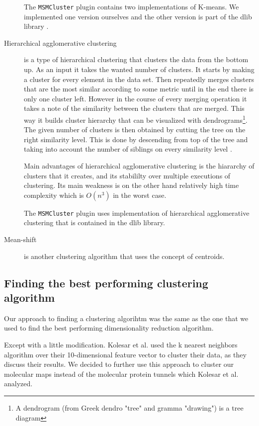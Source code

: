 \documentclass[journal]{vgtc}       %
\begin{document}
\begin{description}
The \verb|MSMCluster| plugin contains two implementations of K-means. We implemented one version ourselves and the other version is part of the dlib library \cite{dlib09}.
\item [Hierarchical agglomerative clustering] is a type of hierarchical clustering that clusters the data from the bottom up. As an input it takes the wanted number of clusters. It starts by making a cluster for every element in the data set. Then repeatedly merges clusters that are the most similar according to some metric until in the end there is only one cluster left. However in the course of every merging operation it takes a note of the similarity between the clusters that are merged. This way it builds cluster hierarchy that can be visualized with dendrograms\footnote{A dendrogram (from Greek dendro "tree" and gramma "drawing") is a tree diagram}. The given number of clusters is then obtained by cutting the tree on the right similarity level. This is done by descending from top of the tree and taking into account the number of siblings on every similarity level \cite{iir}.

Main advantages of hierarchical agglomerative clustering is the hiararchy of clusters that it creates, and its stabililty over multiple executions of clustering. Its main weakness is on the other hand relatively high time complexity which is $O(n^3)$ in the worst case.

The \verb|MSMCluster| plugin uses implementation of hierarchical agglomerative clustering that is contained in the dlib library. 
\item [Mean-shift] is another clustering algorithm that uses the concept of centroids. %
\end{description}

\subsection{Finding the best performing clustering algorithm}
Our approach to finding a clustering algorihtm was the same as the one that we used  to find the best performing dimensionality reduction algorithm.

Except with a little modification. Kolesar et al. \cite{kolesar} used the k nearest neighbors algorithm over their 10-dimensional feature vector to cluster their data, as they discuss their results. We decided to further use this approach to cluster our molecular maps instead of the molecular protein tunnels which Kolesar et al. analyzed.
\end{document}
